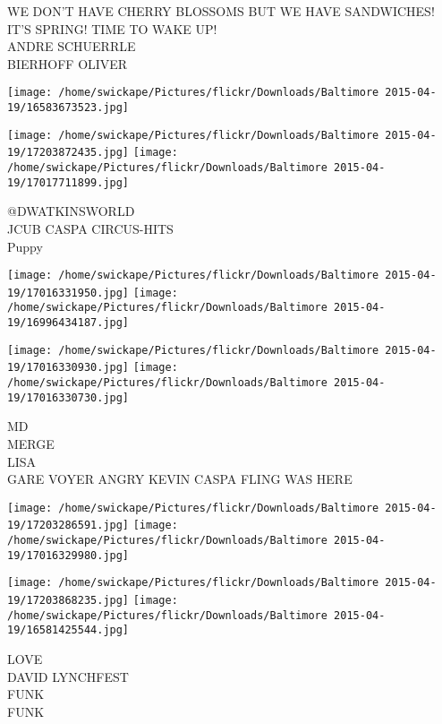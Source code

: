 \documentclass[10pt,letterpaper]{article}
\begin{document}
WE DON'T HAVE CHERRY BLOSSOMS BUT WE HAVE SANDWICHES!\\
IT'S SPRING! TIME TO WAKE UP!\\
ANDRE SCHUERRLE\\
BIERHOFF OLIVER\\
\pagebreak

\texttt{[image: /home/swickape/Pictures/flickr/Downloads/Baltimore 2015-04-19/16583673523.jpg]}

\vspace{0.25in}
\texttt{[image: /home/swickape/Pictures/flickr/Downloads/Baltimore 2015-04-19/17203872435.jpg]}
\texttt{[image: /home/swickape/Pictures/flickr/Downloads/Baltimore 2015-04-19/17017711899.jpg]}

@DWATKINSWORLD\\
JCUB CASPA CIRCUS{-}HITS\\
Puppy\\
\pagebreak

\texttt{[image: /home/swickape/Pictures/flickr/Downloads/Baltimore 2015-04-19/17016331950.jpg]}
\texttt{[image: /home/swickape/Pictures/flickr/Downloads/Baltimore 2015-04-19/16996434187.jpg]}

\texttt{[image: /home/swickape/Pictures/flickr/Downloads/Baltimore 2015-04-19/17016330930.jpg]}
\texttt{[image: /home/swickape/Pictures/flickr/Downloads/Baltimore 2015-04-19/17016330730.jpg]}

MD\\
MERGE\\
LISA\\
GARE VOYER ANGRY KEVIN CASPA FLING WAS HERE\\
\pagebreak

\texttt{[image: /home/swickape/Pictures/flickr/Downloads/Baltimore 2015-04-19/17203286591.jpg]}
\texttt{[image: /home/swickape/Pictures/flickr/Downloads/Baltimore 2015-04-19/17016329980.jpg]}

\texttt{[image: /home/swickape/Pictures/flickr/Downloads/Baltimore 2015-04-19/17203868235.jpg]}
\texttt{[image: /home/swickape/Pictures/flickr/Downloads/Baltimore 2015-04-19/16581425544.jpg]}

LOVE\\
DAVID LYNCHFEST\\
FUNK\\
FUNK\\
\pagebreak
\end{document}
